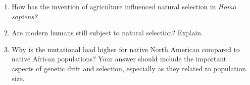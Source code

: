 \documentclass[letterpaper]{tufte-handout}
\begin{document}
\begin{enumerate}
	\item How has the invention of agriculture influenced natural selection in \textit{Homo sapiens?}
	
	\item Are modern humans still subject to natural selection? Explain.
	
	\item Why is the mutational load higher for native North American compared to native African populations? Your answer should include the important aspects of genetic drift and selection, especially as they related to population size.

\end{enumerate}
\end{document}

